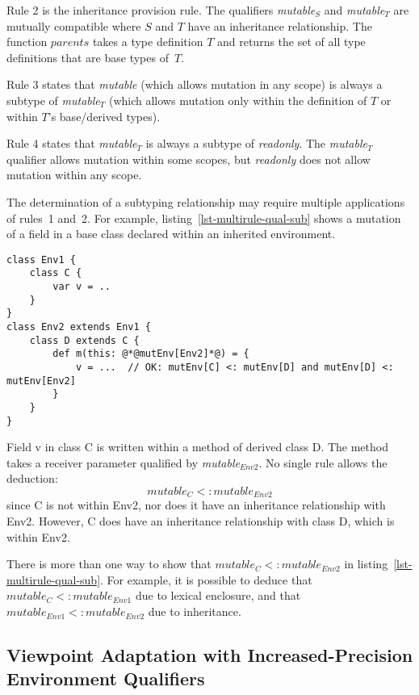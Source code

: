 Rule 2 is the inheritance provision rule.
The qualifiers \mbox{{\em mutable}$_S$} and \mbox{{\em mutable}$_T$} are mutually compatible
where $S$ and $T$ have an inheritance relationship.
The function $parents$ takes a type definition $T$ and returns the set of
all type definitions that are base types of~$T$.

Rule 3 states that \mbox{{\em mutable}} (which allows mutation in any scope)
is always a subtype of \mbox{{\em mutable}$_T$} (which allows mutation only
within the definition of $T$ or within $T$'s base/derived types).

Rule 4 states that \mbox{{\em mutable}$_T$} is always a subtype of \mbox{{\em readonly}}.
The \mbox{{\em mutable}$_T$} qualifier allows mutation within some scopes, but
\mbox{{\em readonly}} does not allow mutation within any scope.

The determination of a subtyping relationship may require multiple applications
of rules~1 and~2. For example, listing~\ref{lst-multirule-qual-sub}
shows a mutation of a field in a base class declared within an inherited environment.
\begin{lstlisting}[caption={Multi-rule Qualifier Subtyping},float={htp},label={lst-multirule-qual-sub}]
class Env1 {
	class C {
		var v = ..
	}
}
class Env2 extends Env1 {
	class D extends C {
		def m(this: @*@mutEnv[Env2]*@) = {
			v = ...  // OK: mutEnv[C] <: mutEnv[D] and mutEnv[D] <: mutEnv[Env2]
		}
	}
}
\end{lstlisting}

Field {\cd v} in class {\cd C} is written within a method of derived class {\cd D}.
The method takes a receiver parameter qualified by \mbox{{\em mutable}$_{Env2}$}.
No single rule allows the deduction:
	$$mutable_C <: mutable_{Env2}$$
since {\cd C} is not within {\cd Env2}, nor does it have an inheritance
relationship with {\cd Env2}.
However, {\cd C} does have an inheritance relationship with class {\cd D},
which is within {\cd Env2}.

There is more than one way to show that $mutable_C <: mutable_{Env2}$ in
listing~\ref{lst-multirule-qual-sub}.
For example, it is possible to deduce that $mutable_C <: mutable_{Env1}$
due to lexical enclosure, and that $mutable_{Env1} <: mutable_{Env2}$
due to inheritance.

\subsection{Viewpoint Adaptation with Increased-Precision Environment Qualifiers} \label{sec-vp-env-qual}

